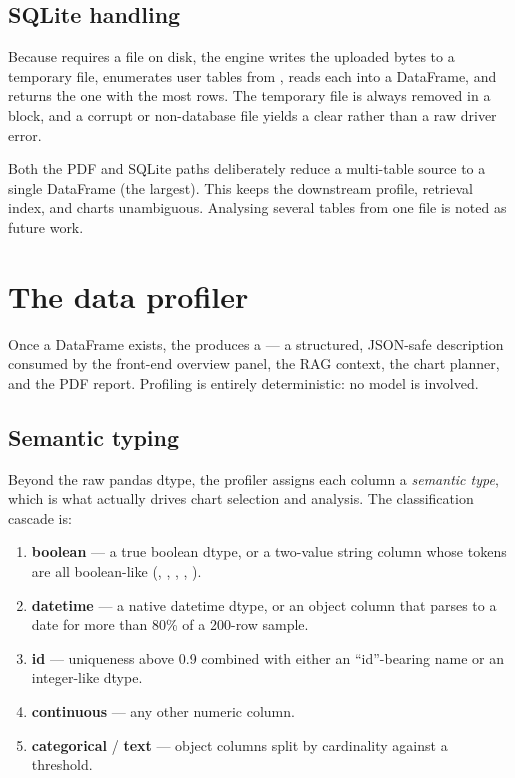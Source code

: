 \subsection{SQLite handling}
Because  requires a file on disk, the engine writes the uploaded
bytes to a temporary file, enumerates user tables from ,
reads each into a DataFrame, and returns the one with the most rows. The
temporary file is always removed in a  block, and a corrupt or
non-database file yields a clear  rather than a raw driver
error.

\begin{uawarn}
Both the PDF and SQLite paths deliberately reduce a multi-table source to a
single DataFrame (the largest). This keeps the downstream profile, retrieval
index, and charts unambiguous. Analysing several tables from one file is noted
as future work.
\end{uawarn}

\section{The data profiler}
Once a DataFrame exists, the  produces a
 --- a structured, JSON-safe description consumed by the
front-end overview panel, the RAG context, the chart planner, and the PDF
report. Profiling is entirely deterministic: no model is involved.

\subsection{Semantic typing}
Beyond the raw pandas dtype, the profiler assigns each column a \emph{semantic
type}, which is what actually drives chart selection and analysis. The
classification cascade is:

\begin{enumerate}
  \item \textbf{boolean} --- a true boolean dtype, or a two-value string column
        whose tokens are all boolean-like (, ,
        , , ).
  \item \textbf{datetime} --- a native datetime dtype, or an object column that
        parses to a date for more than 80\% of a 200-row sample.
  \item \textbf{id} --- uniqueness above 0.9 combined with either an
        ``id''-bearing name or an integer-like dtype.
  \item \textbf{continuous} --- any other numeric column.
  \item \textbf{categorical} / \textbf{text} --- object columns split by
        cardinality against a  threshold.
\end{enumerate}

